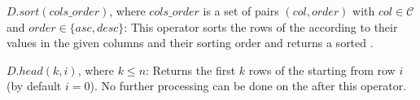   \item $D.sort(cols\_order)$, where $cols\_order$  
  is a set of pairs $(col, order)$ with $col \in \mathcal{C}$ and $order \in \{asc, desc\}$: This operator sorts the rows of the \rdfframe according to their values in the given columns and their sorting order and returns
  a sorted \rdfframe.

	\item $D.head(k, i)$, where $k \leq n$: Returns the first $k$ rows of the \rdfframe starting from row $i$ (by default $i=0$).
	No further processing can be done on the \rdfframe after this operator.

\squishend